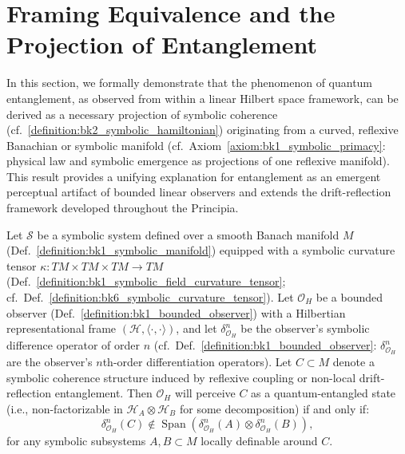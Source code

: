\section[Framing Equivalence]{Framing Equivalence and the Projection of Entanglement}
\label{sec:bk8_framing_equivalence}
In this section, we formally demonstrate that the phenomenon of quantum entanglement, as observed from within a linear Hilbert space framework, can be derived as a necessary projection of symbolic coherence (cf.~\ref{definition:bk2_symbolic_hamiltonian}) originating from a curved, reflexive Banachian or symbolic manifold (cf.~Axiom~\ref{axiom:bk1_symbolic_primacy}: physical law and symbolic emergence as projections of one reflexive manifold). This result provides a unifying explanation for entanglement as an emergent perceptual artifact of bounded linear observers and extends the drift-reflection framework developed throughout the Principia.
\begin{theorem}
\label{theorem:bk8_gradient_dissipation_balance}
Let $\mathcal{S}$ be a symbolic system defined over a smooth Banach manifold $M$ (Def.~\ref{definition:bk1_symbolic_manifold}) equipped with a symbolic curvature tensor $\kappa : TM \times TM \times TM \to TM$ (Def.~\ref{definition:bk1_symbolic_field_curvature_tensor}; cf.~Def.~\ref{definition:bk6_symbolic_curvature_tensor}). Let $\mathcal{O}_H$ be a bounded observer (Def.~\ref{definition:bk1_bounded_observer}) with a Hilbertian representational frame $(\mathcal{H}, \langle \cdot, \cdot \rangle)$, and let $\delta^n_{\mathcal{O}_H}$ be the observer's symbolic difference operator of order $n$ (cf.~Def.~\ref{definition:bk1_bounded_observer}: $\delta_{\mathcal{O}_H}^n$ are the observer's $n$th-order differentiation operators).
Let $C \subset M$ denote a symbolic coherence structure induced by reflexive coupling or non-local drift-reflection entanglement.
Then $\mathcal{O}_H$ will perceive $C$ as a quantum-entangled state (i.e., non-factorizable in $\mathcal{H}_A \otimes \mathcal{H}_B$ for some decomposition) if and only if:
\[
\delta^n_{\mathcal{O}_H}(C) \notin \operatorname{Span}\left( \delta^n_{\mathcal{O}_H}(A) \otimes \delta^n_{\mathcal{O}_H}(B) \right),
\]
for any symbolic subsystems $A, B \subset M$ locally definable around $C$.
\end{theorem}
